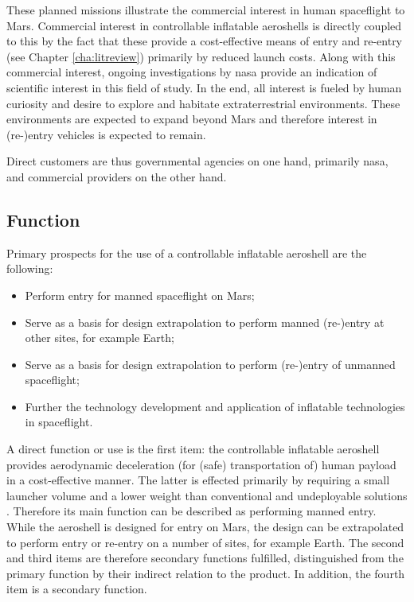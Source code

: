 These planned missions illustrate the commercial interest in human spaceflight to Mars. Commercial interest in controllable inflatable aeroshells is directly coupled to this by the fact that these provide a cost-effective means of entry and re-entry (see Chapter \ref{cha:litreview}) primarily by reduced launch costs. Along with this commercial interest, ongoing investigations by \gls{nasa} provide an indication of scientific interest in this field of study. In the end, all interest is fueled by human curiosity and desire to explore and habitate extraterrestrial environments. These environments are expected to expand beyond Mars and therefore interest in (re-)entry vehicles is expected to remain.

Direct customers are thus governmental agencies on one hand, primarily \gls{nasa}, and commercial providers on the other hand. 

\subsection{Function}
Primary prospects for the use of a controllable inflatable aeroshell are the following:
\begin{itemize}
\item Perform entry for manned spaceflight on Mars;
\item Serve as a basis for design extrapolation to perform manned (re-)entry at other sites, for example Earth;
\item Serve as a basis for design extrapolation to perform (re-)entry of unmanned spaceflight;
\item Further the technology development and application of inflatable technologies in spaceflight.
\end{itemize}
A direct function or use is the first item: the controllable inflatable aeroshell provides aerodynamic deceleration (for (safe) transportation of) human payload in a cost-effective manner. The latter is effected primarily by requiring a small launcher volume and a lower weight than conventional and undeployable solutions \cite{Hughes2005, Cianciolo2010}. Therefore its main function can be described as performing manned entry. While the aeroshell is designed for entry on Mars, the design can be extrapolated to perform entry or re-entry on a number of sites, for example Earth. The second and third items are therefore secondary functions fulfilled, distinguished from the primary function by their indirect relation to the product. In addition, the fourth item is a secondary function.

